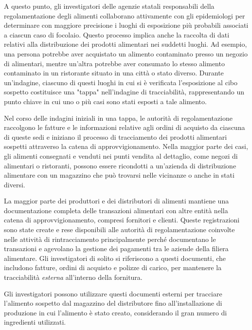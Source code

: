 A questo punto, gli investigatori delle agenzie statali responsabili della regolamentazione degli alimenti collaborano attivamente con gli epidemiologi per determinare con maggiore precisione i luoghi di esposizione più probabili associati a ciascun caso di focolaio. Questo processo implica anche la raccolta di dati relativi alla distribuzione dei prodotti alimentari nei suddetti luoghi. Ad esempio, una persona potrebbe aver acquistato un alimento contaminato presso un negozio di alimentari, mentre un'altra potrebbe aver consumato lo stesso alimento contaminato in un ristorante situato in una città o stato diverso. Durante un'indagine, ciascuno di questi luoghi in cui si è verificata l'esposizione al cibo sospetto costituisce una "tappa" nell'indagine di tracciabilità, rappresentando un punto chiave in cui uno o più casi sono stati esposti a tale alimento. 

Nel corso delle indagini iniziali in una tappa, le autorità di regolamentazione raccolgono le fatture e le informazioni relative agli ordini di acquisto da ciascuna di queste sedi e iniziano il processo di tracciamento dei prodotti alimentari sospetti attraverso la catena di approvvigionamento. Nella maggior parte dei casi, gli alimenti consegnati e venduti nei punti vendita al dettaglio, come negozi di alimentari o ristoranti, possono essere ricondotti a un'azienda di distribuzione alimentare con un magazzino che può trovarsi nelle vicinanze o anche in stati diversi.

La maggior parte dei produttori e dei distributori di alimenti mantiene una documentazione completa delle transazioni alimentari con altre entità nella catena di approvvigionamento, compresi fornitori e clienti. Queste registrazioni sono state create e rese disponibili alle autorità di regolamentazione coinvolte nelle attività di rintracciamento principalmente perché documentano le transazioni e agevolano la gestione dei pagamenti tra le aziende della filiera alimentare. Gli investigatori di solito si riferiscono a questi documenti, che includono fatture, ordini di acquisto e polizze di carico, per mantenere la tracciabilità \textit{esterna} all'interno della fornitura.

Gli investigatori possono utilizzare questi documenti esterni per tracciare l'alimento sospetto dal magazzino del distributore fino all'installazione di produzione in cui l'alimento è stato creato, considerando il gran numero di ingredienti utilizzati.

